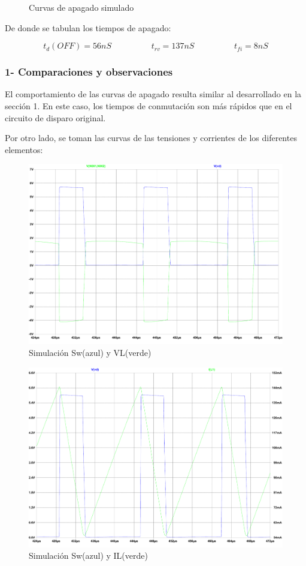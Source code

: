 \documentclass[e4_tp1_main.tex]{subfiles}
\begin{document}
\begin{figure}[H]
\centering
\caption{Curvas de apagado simulado}
\end{figure}

De donde se tabulan los tiempos de apagado:

\[
t_d(OFF) = 56nS \hspace{2cm} t_{rv} = 137nS \hspace{2cm} t_{fi} = 8nS 
\]

\subsubsection*{1- Comparaciones y observaciones}

El comportamiento de las curvas de apagado resulta similar al desarrollado en la sección 1. En este caso, los tiempos de conmutación son más rápidos que en el circuito de disparo original.

\par
Por otro lado, se toman las curvas de las tensiones y corrientes de los diferentes elementos:

\begin{figure}[H]
\centering
\includegraphics[width=0.7\linewidth]{Imagenes/Punto3/Sw-VL.pdf}
\caption{Simulación Sw(azul) y VL(verde)}
\end{figure}

\begin{figure}[H]
\centering
\includegraphics[width=0.7\linewidth]{Imagenes/Punto3/Sw-IL.pdf}
\caption{Simulación Sw(azul) y IL(verde)}
\end{figure}
\end{document}
